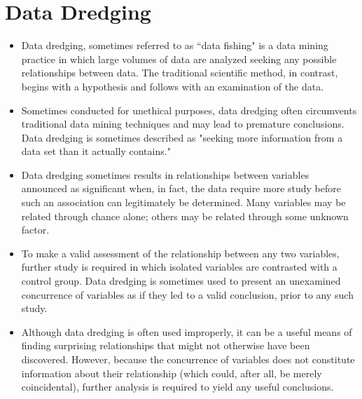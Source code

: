 \section{Data Dredging}
\begin{itemize}
\item Data dredging, sometimes referred to as ``data fishing" is a data mining practice in which large volumes of data are analyzed seeking any possible relationships between data. The traditional scientific method, in contrast, begins with a hypothesis and follows with an examination of the data. 
\item Sometimes conducted for unethical purposes, data dredging often circumvents traditional data mining techniques and may lead to premature conclusions. Data dredging is sometimes described as "seeking more information from a data set than it actually contains."

\item Data dredging sometimes results in relationships between variables announced as significant when, in fact, the data require more study before such an association can legitimately be determined. Many variables may be related through chance alone; others may be related through some unknown factor. 
\item To make a valid assessment of the relationship between any two variables, further study is required in which isolated variables are contrasted with a control group. Data dredging is sometimes used to present an unexamined concurrence of variables as if they led to a valid conclusion, prior to any such study.

\item Although data dredging is often used improperly, it can be a useful means of finding surprising relationships that might not otherwise have been discovered. However, because the concurrence of variables does not constitute information about their relationship (which could, after all, be merely coincidental), further analysis is required to yield any useful conclusions.
\end{itemize}
